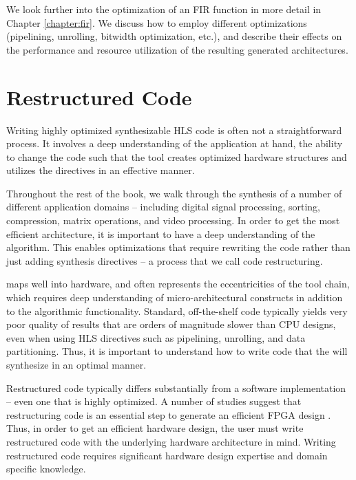 We look further into the optimization of an FIR function in more detail in Chapter \ref{chapter:fir}. We discuss how to employ different optimizations (pipelining, unrolling, bitwidth optimization, etc.), and describe their effects on the performance and resource utilization of the resulting generated architectures.

\section{Restructured Code}

Writing highly optimized synthesizable HLS code is often not a straightforward process. It involves a deep understanding of the application at hand, the ability to change the code such that the \VHLS tool creates optimized hardware structures and utilizes the directives in an effective manner. 

Throughout the rest of the book, we walk through the synthesis of a number of different application domains -- including digital signal processing, sorting, compression, matrix operations, and video processing. In order to get the most efficient architecture, it is important to have a deep understanding of the algorithm. This enables optimizations that require rewriting the code rather than just adding synthesis directives -- a process that we call code restructuring. 


 maps well into hardware, and often represents the eccentricities of the tool chain, which requires deep understanding of micro-architectural constructs in addition to the algorithmic functionality. Standard, off-the-shelf code typically yields very poor quality of results that are orders of magnitude slower than CPU designs, even when using HLS directives such as pipelining, unrolling, and data partitioning. Thus, it is important to understand how to write code that the \VHLS will synthesize in an optimal manner.

Restructured code typically differs substantially from a software implementation -- even one that is highly optimized. A number of studies suggest that restructuring code is an essential step to generate an efficient FPGA
design \cite{mataidesigning, matai2energy, cong2011high, chen2012fpga, lee250high}. Thus, in order to get an efficient hardware design, the user must write restructured code with the underlying
hardware architecture in mind. Writing restructured code requires significant
hardware design expertise and domain specific knowledge. 

